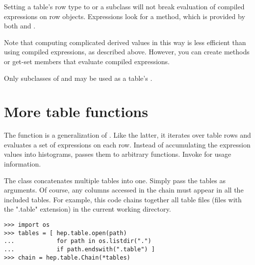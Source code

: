 Setting a table's row type to  or a subclass will not
break evaluation of compiled expressions on row objects.  Expressions
look for a  method, which is provided by both
 and .

Note that computing complicated derived values in this way is less
efficient than using compiled expressions, as described above.  However,
you can create methods or get-set members that evaluate compiled
expressions.  

Only subclasses of  and  may be used as
a table's .


\section{More table functions}

The function  is a generalization of
.  Like the latter, it iterates over table
rows and evaluates a set of expressions on each row.  Instead of
accumulating the expression values into histograms, passes them to
arbitrary functions.  Invoke  for usage
information. 

The  class concatenates multiple tables into one.
Simply pass the tables as arguments.  Of course, any columns accessed in
the chain must appear in all the included tables.  For example, this
code chains together all table files (files with the ".table" extension)
in the current working directory.
\begin{verbatim}
>>> import os
>>> tables = [ hep.table.open(path)
...            for path in os.listdir(".") 
...            if path.endswith(".table") ]
>>> chain = hep.table.Chain(*tables)
\end{verbatim}


